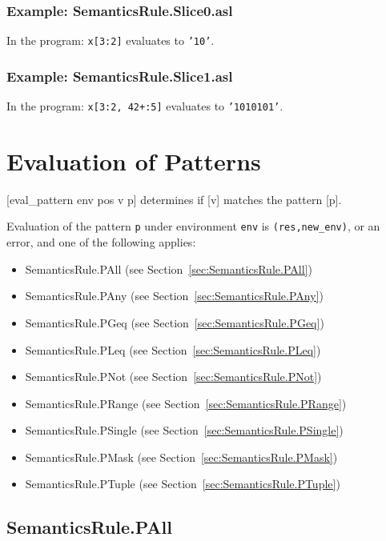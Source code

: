\documentclass{book}
\begin{document}
  \subsection{Example: SemanticsRule.Slice0.asl}
  In the program:
  \texttt{x[3:2]} evaluates to \texttt{'10'}.

  \subsection{Example: SemanticsRule.Slice1.asl}
  In the program:
  \texttt{x[3:2, 42+:5]} evaluates to \texttt{'1010101'}.

\chapter{Evaluation of Patterns \label{chap:eval_pattern}}
[eval\_pattern env pos v p] determines if [v] matches the pattern [p].

Evaluation of the pattern \texttt{p} under environment \texttt{env} is
\texttt{(res,new\_env)}, or an error, and one of the following applies:
\begin{itemize}
\item SemanticsRule.PAll (see Section~\ref{sec:SemanticsRule.PAll})
\item SemanticsRule.PAny (see Section~\ref{sec:SemanticsRule.PAny})
\item SemanticsRule.PGeq (see Section~\ref{sec:SemanticsRule.PGeq})
\item SemanticsRule.PLeq (see Section~\ref{sec:SemanticsRule.PLeq})
\item SemanticsRule.PNot (see Section~\ref{sec:SemanticsRule.PNot})
\item SemanticsRule.PRange (see Section~\ref{sec:SemanticsRule.PRange})
\item SemanticsRule.PSingle (see Section~\ref{sec:SemanticsRule.PSingle})
\item SemanticsRule.PMask (see Section~\ref{sec:SemanticsRule.PMask})
\item SemanticsRule.PTuple (see Section~\ref{sec:SemanticsRule.PTuple})
\end{itemize}

\section{SemanticsRule.PAll \label{sec:SemanticsRule.PAll}}
\end{document}
